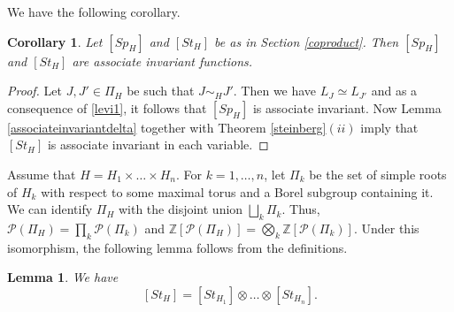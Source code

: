 \documentclass{amsart}
\theoremstyle{plain}
\newtheorem{corollary}{Corollary}[theorem]
\newtheorem{lemma}[theorem]{Lemma}
\theoremstyle{definition}
\theoremstyle{remark}
\begin{document}
We have the following corollary.
\begin{corollary}\label{sp and st are associate invariant}
Let $[Sp_{H}]$ and $[St_{H}]$ be as in Section \ref{coproduct}. Then $[Sp_{H}]$ and $[St_{H}]$ are associate invariant functions.
\end{corollary}
\begin{proof}
Let $J, J'\in\Pi_{H}$ be such that $J\sim_{H}J'$. Then we have $L_{J}\simeq L_{J'}$ and as a consequence of \eqref{levi1}, it follows that $[Sp_{H}]$ is associate invariant. Now Lemma \ref{associateinvariantdelta} together with Theorem \ref{steinberg}$(ii)$ imply that $[St_{H}]$ is associate invariant in each variable.
\end{proof}
Assume that $H=H_1\times\ldots\times H_n$. For $k=1,\ldots, n$, let $\Pi_k$ be the set of simple roots of $H_k$ with respect to some maximal torus and a Borel subgroup containing it. We can identify $\Pi_{H}$ with the disjoint union $\bigsqcup_k\Pi_k$. Thus, $\mathcal{P}(\Pi_{H})=\prod_k\mathcal{P}(\Pi_k)$ and $\mathbb{Z}[\mathcal{P}(\Pi_{H})]=\bigotimes_k\mathbb{Z}[\mathcal{P}(\Pi_k)]$. Under this isomorphism, the following lemma follows from the definitions.
\begin{lemma}\label{lm1}
We have
\[
    [St_H]=[St_{H_1}]\otimes\ldots\otimes[St_{H_n}].
\]
\end{lemma}
\end{document}

